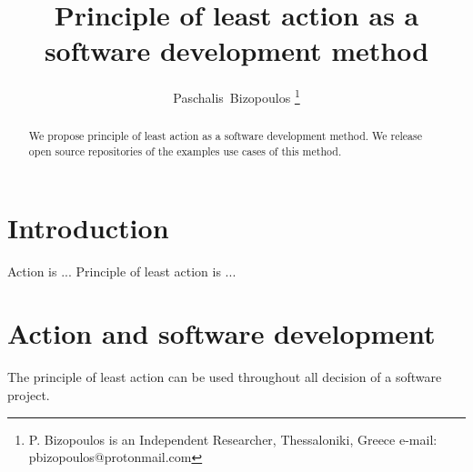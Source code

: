 \documentclass[journal]{IEEEtran}
\begin{document}

\title{Principle of least action as a software development method}

\author{Paschalis~Bizopoulos
\thanks{P. Bizopoulos is an Independent Researcher, Thessaloniki, Greece e-mail: pbizopoulos@protonmail.com}}

\maketitle

\begin{abstract}
	We propose principle of least action as a software development method.
	We release open source repositories of the examples use cases of this method.
\end{abstract}

\section{Introduction}
Action is ...
Principle of least action is ...

\section{Action and software development}
The principle of least action can be used throughout all decision of a software project.
\end{document}
